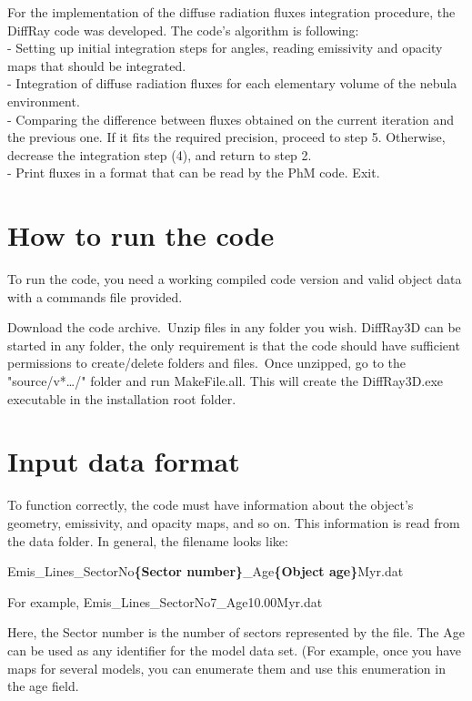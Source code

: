 \documentclass[a4paper]{article}
\begin{document}
For the implementation of the diffuse radiation fluxes integration procedure, the DiffRay code was developed.
The code's algorithm is following:\\
 - Setting up initial integration steps for angles, reading emissivity and opacity maps that should be
integrated.\\
 - Integration of diffuse radiation fluxes for each elementary volume of the nebula environment.\\
 - Comparing the difference between fluxes obtained on the current iteration and the previous one.
If it fits the required precision, proceed to step 5. Otherwise, decrease the integration step (4),
and return to step 2.\\
 - Print fluxes in a format that can be read by the PhM code. Exit.\\

\section{How to run the code}

To run the code, you need a working compiled code version and valid object data with a commands file provided.


Download the code archive.\
Unzip files in any folder you wish. DiffRay3D can be started in any folder, the only requirement is that the code should have sufficient permissions to create/delete folders and files.\
Once unzipped, go to the "source/v*\ldots/" folder and run MakeFile.all. This will create the DiffRay3D.exe executable in the installation root folder.\
\section{Input data format}
To function correctly, the code must have information about the object's geometry, emissivity, and opacity maps, and so on. This information is read from the data folder. In general, the filename looks like:

Emis\_Lines\_SectorNo{\bf \{Sector number\}}\_Age{\bf \{Object age\}}Myr.dat

For example, Emis\_Lines\_SectorNo7\_Age10.00Myr.dat

Here, the Sector number is the number of sectors represented by the file. The Age can be used as any identifier for the model data set. (For example, once you have maps for several models, you can enumerate them and use this enumeration in the age field.
\end{document}
